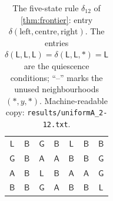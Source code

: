 \begin{table}[p]
\begin{tabular}{@{}cc|ccccc@{}}
$\mathsf{L}$ & $\mathsf{B}$ & $\mathsf{G}$ & $\mathsf{B}$ & $\mathsf{L}$ & $\mathsf{B}$ & $\mathsf{B}$\\
$\mathsf{G}$ & $\mathsf{B}$ & $\mathsf{A}$ & $\mathsf{A}$ & $\mathsf{B}$ & $\mathsf{B}$ & $\mathsf{G}$\\
$\mathsf{A}$ & $\mathsf{B}$ & $\mathsf{L}$ & $\mathsf{B}$ & $\mathsf{A}$ & $\mathsf{A}$ & $\mathsf{G}$\\
$\mathsf{B}$ & $\mathsf{B}$ & $\mathsf{G}$ & $\mathsf{A}$ & $\mathsf{B}$ & $\mathsf{B}$ & $\mathsf{L}$\\
\bottomrule
\end{tabular}
\caption{The five-state rule $\delta_{12}$ of \cref{thm:frontier}: entry $\delta(\text{left},\text{centre},\text{right})$. The entries $\delta(\mathsf L,\mathsf L,\mathsf L)=\delta(\mathsf L,\mathsf L,\ast)=\mathsf L$ are the quiescence conditions; ``--'' marks the unused neighbourhoods $(\ast,y,\ast)$. Machine-readable copy: \texttt{results/uniformA\_2-12.txt}.}
\label{tab:delta12}
\end{table}
